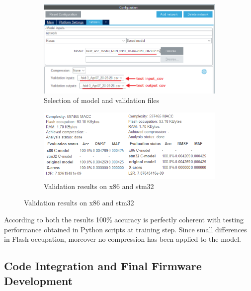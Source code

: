 \begin{center}
	\begin{figure}[H]
		\begin{subfigure}[H]{0.45\textwidth}
			\hfill\includegraphics[scale=0.55]{figures/validation_gui.png}\vspace*{\fill}
			\caption{Selection of model and validation files}
		\end{subfigure}
	\hfill
		\begin{subfigure}[H]{0.45\textwidth}
			\hfill\includegraphics[scale=0.7]{figures/x86_stm32_validation.png}\vspace*{\fill}
			\caption{Validation results on x86 and stm32}
		\end{subfigure}
	\end{figure}
\end{center}
According to both the results 100\% accuracy is perfectly coherent with testing performance obtained in Python scripts at training step. Since small differences in Flash occupation, moreover no compression has been applied to the model.







\subsection{Code Integration and Final Firmware Development}

